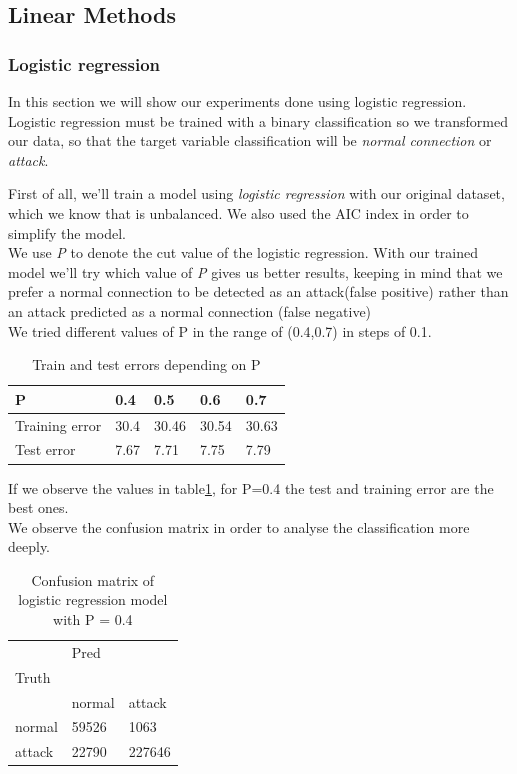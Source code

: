 \documentclass[a4paper]{article} %
\begin{document}
\subsection{Linear Methods}
\subsubsection{Logistic regression}
In this section we will show our experiments done using logistic regression. \\
Logistic regression must be trained with a binary classification so we transformed our data, so that the target variable classification will be \textit{normal connection} or \textit{attack}.

First of all, we'll train a model using \textit{logistic regression} with our original dataset, which we know that is unbalanced.
We also used the AIC index in order to simplify the model.\\
We use \textit{P} to denote the cut value of the logistic regression.
With our trained model we'll try which value of \textit{P} gives us better results, keeping in mind that we prefer a normal connection to be detected as an attack(false positive) rather than an attack predicted as a normal connection (false negative)  \\
We tried different values of P in the range of (0.4,0.7) in steps of 0.1.
\begin{table}[h]
	\centering
	\begin{tabular}{l|llll}
		P              & 0.4  & 0.5   & 0.6   & 0.7   \\
		\hline 
		Training error & 30.4 & 30.46 & 30.54 & 30.63 \\
		Test error     & 7.67 & 7.71  & 7.75  & 7.79 
	\end{tabular}
	\caption{Train and test errors depending on P}
	\label{cut}
\end{table}

If we observe the values in table\ref{cut}, for P=0.4 the test and training error are the best ones. \\

We observe the confusion matrix in order to analyse the classification more deeply.

\begin{table}[h]
	\centering
	\begin{tabular}{l|ll}
		& Pred   &        \\
		Truth  &        &        \\
		& normal & attack \\
		\hline
		normal & 59526  & 1063   \\
		attack & 22790  & 227646
	\end{tabular}
	\caption{Confusion matrix of logistic regression model with P = 0.4}
	\label{logistic}
\end{table}
\end{document}
